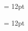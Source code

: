 \documentclass[a4paper,twoside]{article}
\begin{document}
\begin{multicols}{2}
\begin{spacing}{0.5}{\raggedright}
\begin{spacing}{0.5}{\raggedright} 
\spanheadwordminorentryvariantletDatadicBody{ }\spanvisiblevariantentryrefsminorentryvariantletDatadicBody{ \{} \spanspanmxbheadwordreferencedentryreferencedentriesvisiblevariantentryrefvisiblevariantentryrefsminorentryvariantletDatadicBody{ } \spanvisiblevariantentryrefsminorentryvariantletDatadicBody{\} }\spanspanessummarydefinitionminorentryvariantletDatadicBody{ }  \end{spacing}
\begin{spacing}{0.5}
\hangindent= 12pt
  \spanspanespartofspeechmorphosyntaxanalysissensesensecontentsensesentryletDatadicBody{ } \spanspanesdefinitionsensesensecontentsensesentryletDatadicBody{ } \end{spacing}
\begin{spacing}{0.5}
\hangindent= 12pt

\end{spacing}
\end{spacing}
\end{multicols}
\end{document}
